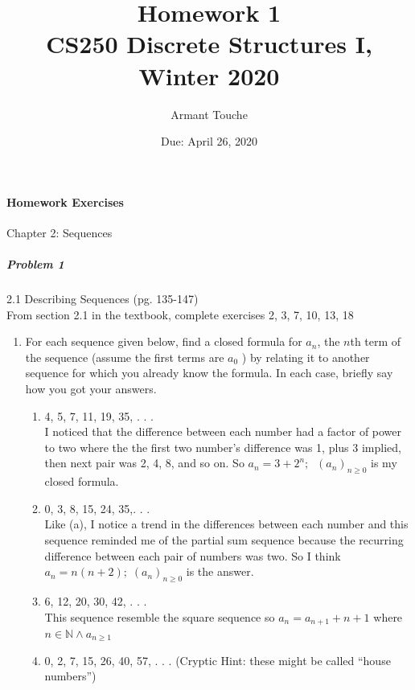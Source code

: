 \documentclass[11pt,a4paper]{article}
\title{\bf Homework 1\\[1ex]
\rm\normalsize CS250 Discrete Structures I, Winter 2020 }
\date{\normalsize Due: April 26, 2020}
\author{\normalsize Armant Touche}
\newcommand\setItemNumber[1]{\setcounter{enumi}{\numexpr#1-1\relax}}
\begin{document}
 
\vspace{0cm}\maketitle 
	\paragraph{Homework Exercises} Chapter 2: Sequences
	
	\subparagraph{Problem 1} 2.1 Describing Sequences (pg. 135-147)\\
			
		From section 2.1 in the textbook, complete exercises 2, 3, 7, 10, 13, 18

        \begin{enumerate}

            \setItemNumber{2}
            \item For each sequence given below, find a closed formula for $a_n$, the $n$th term of the sequence (assume the first terms are $a_0$ ) by relating it to another sequence for which you already know the formula. In each case, briefly say how you got your answers.
                \begin{enumerate}
                    \item 4, 5, 7, 11, 19, 35, . . .\\
                        I noticed that the difference between each number had a factor of power to two where the the first two number's difference was 1, plus 3 implied, then next pair was 2, 4, 8, and so on. So $a_n = 3 + 2^n;\;\;(a_n)_{n\geq 0}$ is my closed formula.
                    \item 0, 3, 8, 15, 24, 35,. . .\\
                        Like (a), I notice a trend in the differences between each number and this sequence reminded me of the partial sum sequence because the recurring difference between each pair of numbers was two. So I think $a_n = n(n + 2);\;(a_n)_{n\geq 0}$ is the answer.
                    \item 6, 12, 20, 30, 42, . . .\\
                        This sequence resemble the square sequence so $a_n = a_{n + 1} + {n + 1}$ where $n\in\mathbb{N}\land a_{n\geq 1}$
                    \item 0, 2, 7, 15, 26, 40, 57, . . . (Cryptic Hint: these might be called “house numbers”)
                        
                \end{enumerate}


\end{enumerate}
\end{document}
